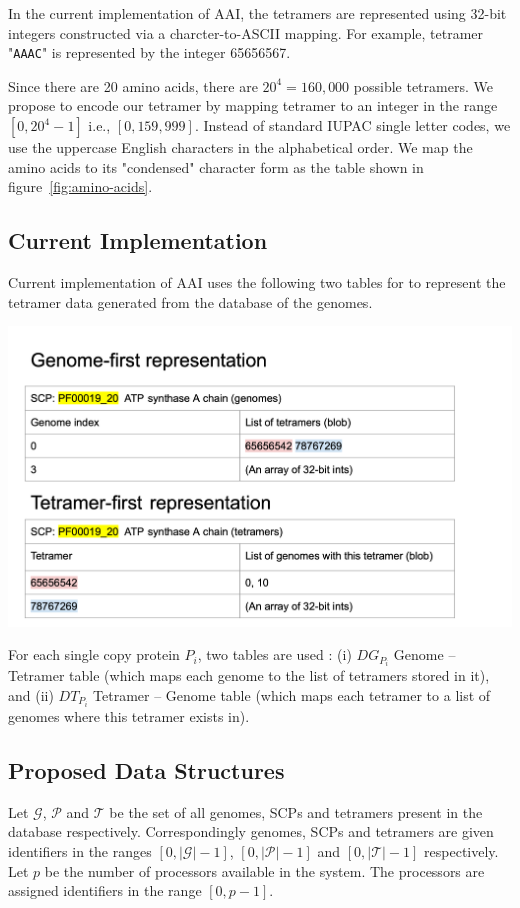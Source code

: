 \documentclass{article}[11pt]
\begin{document}
In the current implementation of AAI, the tetramers are represented using 32-bit integers constructed via a charcter-to-ASCII mapping. For example, tetramer "\texttt{AAAC}" is represented by the integer 65656567.

Since there are 20 amino acids, there are $20^4 = 160,000$ possible tetramers.
We propose to encode our tetramer by mapping tetramer to an integer in the range $[0, 20^4 - 1]$ i.e., $[0,159,999]$. 
Instead of standard IUPAC single letter codes, we use the uppercase English characters in the alphabetical order.
We map the amino acids to its "condensed" character form as the table shown in figure~\ref{fig:amino-acids}. 



\subsection{Current Implementation}
\label{data:current}
Current implementation of AAI uses the following two tables for  to represent the tetramer data generated from the database of the genomes.

\includegraphics[width=\textwidth]{figures/Database_Representation.png}

For each single copy protein $P_i$, two tables are used : 
(i)  $DG_{P_i}$ Genome -- Tetramer table (which maps each genome to the list of tetramers stored in it), and
(ii) $DT_{P_i}$ Tetramer -- Genome table (which maps each tetramer to a list of genomes where this tetramer exists in). 


\subsection{Proposed Data Structures}
Let $\mathcal{G}$, $\mathcal{P}$ and  $\mathcal{T}$ be the set of all genomes, SCPs and tetramers present in the database respectively.
Correspondingly genomes, SCPs and tetramers are given identifiers in the ranges  $[0,|\mathcal{G}|-1]$, $[0,|\mathcal{P}|-1]$ and $[0,|\mathcal{T}|-1]$ respectively.  
Let $p$ be the number of processors available in the system. The processors are assigned identifiers in the range $[0,p-1]$. 
\end{document}
